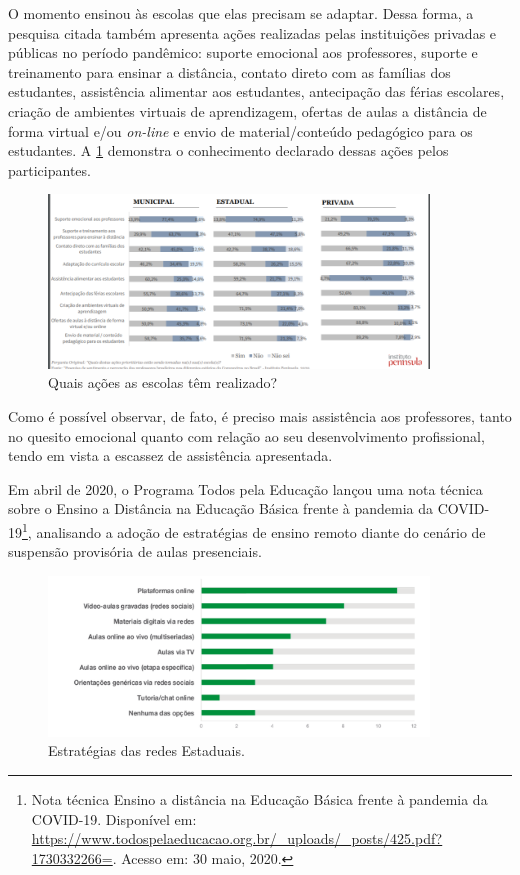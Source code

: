 \documentclass{textolivre}
\begin{document}
O momento ensinou às escolas que elas precisam se adaptar. Dessa forma, a pesquisa citada também apresenta ações realizadas pelas instituições privadas e públicas no período pandêmico: suporte emocional aos professores, suporte e treinamento para ensinar a distância, contato direto com as famílias dos estudantes, assistência alimentar aos estudantes, antecipação das férias escolares, criação de ambientes virtuais de aprendizagem, ofertas de aulas a distância de forma virtual e/ou \textit{on-line} e envio de material/conteúdo pedagógico para os estudantes. A \cref{Fig01} demonstra o conhecimento declarado dessas ações pelos participantes.

\begin{figure}[htbp]
 \centering
 \includegraphics[width=0.90\textwidth]{Fig01}
 \caption{Quais ações as escolas têm realizado?}
 \label{Fig01}
\end{figure}

Como é possível observar, de fato, é preciso mais assistência aos professores, tanto no quesito emocional quanto com relação ao seu desenvolvimento profissional, tendo em vista a escassez de assistência apresentada.

Em abril de 2020, o Programa Todos pela Educação lançou uma nota técnica sobre o Ensino a Distância na Educação Básica frente à pandemia da COVID-19\footnote{Nota técnica Ensino a distância na Educação Básica frente à pandemia da COVID-19. Disponível em: \url{https://www.todospelaeducacao.org.br/_uploads/_posts/425.pdf?1730332266=}. Acesso em: 30 maio, 2020.}, analisando a adoção de estratégias de ensino remoto diante do cenário de suspensão provisória de aulas presenciais. 

\begin{figure}[htbp]
 \centering
 \includegraphics[width=0.90\textwidth]{Fig02}
 \caption{Estratégias das redes Estaduais.}
 \label{Fig02}
\end{figure}
\end{document}
